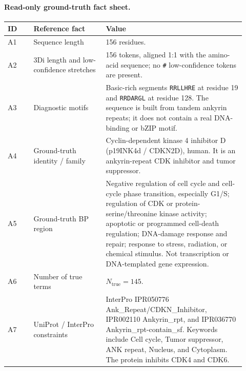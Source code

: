 \begin{appendices}
\paragraph{Read-only ground-truth fact sheet.}
\begin{longtable}{P{0.10\linewidth}P{0.28\linewidth}P{0.54\linewidth}}
\toprule
\textbf{ID} & \textbf{Reference fact} & \textbf{Value} \\
\midrule
A1 & Sequence length & 156 residues. \\
A2 & 3Di length and low-confidence stretches & 156 tokens, aligned 1:1 with the amino-acid sequence; no \texttt{\#} low-confidence tokens are present. \\
A3 & Diagnostic motifs & Basic-rich segments \texttt{RRLLHRE} at residue 19 and \texttt{RRDARGL} at residue 128. The sequence is built from tandem ankyrin repeats; it does not contain a real DNA-binding or bZIP motif. \\
A4 & Ground-truth identity / family & Cyclin-dependent kinase 4 inhibitor D (p19INK4d / CDKN2D), human. It is an ankyrin-repeat CDK inhibitor and tumor suppressor. \\
A5 & Ground-truth BP region & Negative regulation of cell cycle and cell-cycle phase transition, especially G1/S; regulation of CDK or protein-serine/threonine kinase activity; apoptotic or programmed cell-death regulation; DNA-damage response and repair; response to stress, radiation, or chemical stimulus. Not transcription or DNA-templated gene expression. \\
A6 & Number of true terms & \(N_{\mathrm{true}} = 145\). \\
A7 & UniProt / InterPro constraints & InterPro IPR050776 Ank\_Repeat/CDKN\_Inhibitor, IPR002110 Ankyrin\_rpt, and IPR036770 Ankyrin\_rpt-contain\_sf. Keywords include Cell cycle, Tumor suppressor, ANK repeat, Nucleus, and Cytoplasm. The protein inhibits CDK4 and CDK6. \\
\bottomrule
\end{longtable}


\end{appendices}
